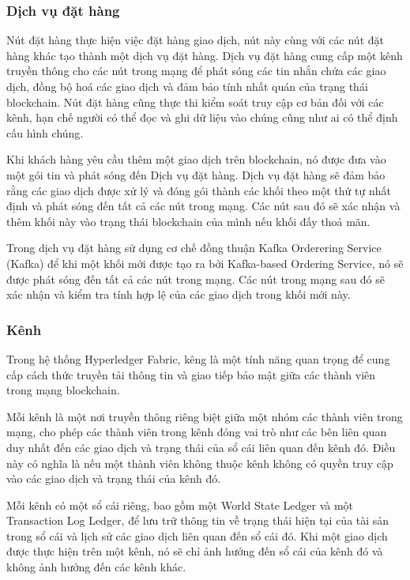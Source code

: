 \subsubsection{Dịch vụ đặt hàng}
Nút đặt hàng thực hiện việc đặt hàng giao dịch, nút này 
cùng với các nút đặt hàng khác tạo thành một dịch vụ đặt hàng.
Dịch vụ đặt hàng cung cấp một kênh truyền thông cho 
các nút trong mạng để phát sóng các tin nhắn chứa các giao 
dịch, đồng bộ hoá các giao dịch và đảm bảo tính nhất quán 
của trạng thái blockchain.
Nút đặt hàng cũng thực thi kiểm soát truy cập cơ bản đối với 
các kênh, hạn chế người có thể đọc và ghi dữ liệu vào chúng 
cũng như ai có thể định cấu hình chúng. \cite{hyperledger1}

Khi khách hàng yêu cầu thêm một giao dịch trên blockchain, 
nó được đưa vào một gói tin và phát sóng đến Dịch vụ đặt 
hàng. Dịch vụ đặt hàng sẽ đảm bảo rằng các giao dịch được 
xử lý và đóng gói thành các khối theo một thứ tự nhất định 
và phát sóng đến tất cả các nút trong mạng. Các nút sau đó 
sẽ xác nhận và thêm khối này vào trạng thái blockchain của 
mình nếu khối đấy thoả mãn.

Trong dịch vụ đặt hàng sử dụng cơ chế đồng thuận Kafka Orderering Service (Kafka) để khi một 
khối mới được tạo ra bởi Kafka-based Ordering Service, nó sẽ được phát sóng đến tất cả các nút trong mạng. Các nút trong mạng sau đó sẽ xác nhận và kiểm tra tính hợp lệ của các giao dịch trong khối mới này.


\subsubsection{Kênh}

Trong hệ thống Hyperledger Fabric, kêng là một tính năng quan trọng để cung cấp cách thức 
truyền tải thông tin và giao tiếp bảo mật giữa các thành viên trong mạng blockchain.

Mỗi kênh là một nơi truyền thông riêng biệt giữa một nhóm các thành viên trong mạng, 
cho phép các thành viên trong kênh đóng vai trò như các bên liên quan duy nhất đến các giao 
dịch và trạng thái của sổ cái liên quan đến kênh đó. Điều này có nghĩa là nếu một thành 
viên không thuộc kênh không có quyền truy cập vào các giao dịch và trạng thái của kênh đó.

Mỗi kênh có một sổ cái riêng, bao gồm một World State Ledger và một Transaction Log Ledger, 
để lưu trữ thông tin về trạng thái hiện tại của tài sản trong sổ cái và lịch sử các giao dịch liên quan đến 
sổ cái đó. Khi một giao dịch được thực hiện trên một kênh, nó sẽ chỉ ảnh hưởng đến sổ cái 
của kênh đó và không ảnh hưởng đến các kênh khác.

